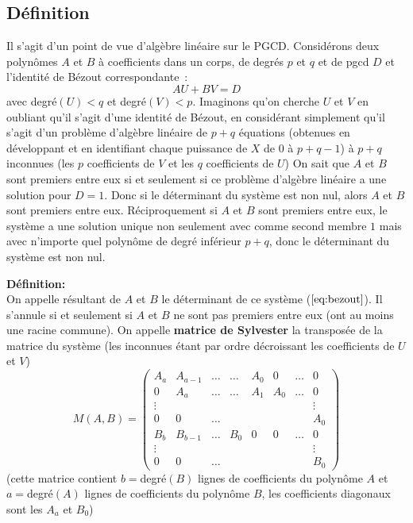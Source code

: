 \documentclass[a4paper,11pt]{article}
\begin{document}
\begin{giacjshere}
\subsection{D\'efinition}
Il s'agit d'un point de vue d'algèbre linéaire sur le PGCD. Considérons
deux polynômes $A$ et $B$ \`a coefficients dans un corps,
de degrés $p$ et $q$ et de pgcd $D$ et 
l'identité de Bézout correspondante~:
\begin{equation} \label{eq:bezout}
 A U + B V =D
\end{equation}
avec degré$(U)<q$ et degré$(V)<p$.
Imaginons qu'on cherche $U$ et $V$ en oubliant qu'il s'agit d'une
identité de Bézout, en considérant simplement qu'il s'agit d'un
problème d'algèbre linéaire de $p+q$ équations (obtenues en développant
et en identifiant chaque puissance de $X$ de 0 à $p+q-1$) 
à $p+q$ inconnues (les $p$ coefficients de $V$ et les $q$ coefficients de $U$)
On sait que $A$ et $B$ sont premiers entre eux si et seulement si ce problème
d'algèbre linéaire a une solution pour $D=1$. Donc si le déterminant
du système est non nul, alors $A$ et $B$ sont premiers entre eux.
Réciproquement si $A$ et $B$ sont premiers entre eux, le système a
une solution unique non seulement avec comme second membre $1$ mais avec
n'importe quel polynôme de degré inférieur $p+q$, donc le
déterminant du système est non nul.

{\bf Définition:} \\
On appelle résultant de $A$ et $B$ le déterminant de ce système 
(\(\ref{eq:bezout}\)). Il s'annule si et seulement si $A$ et $B$
ne sont pas premiers entre eux (ont au moins une racine commune).
On appelle {\bf matrice de Sylvester} la transposée de la matrice du système
(les inconnues étant par ordre décroissant les coefficients de $U$
et $V$)
\[ M(A,B)=\left( \begin{array}{cccccccc}
A_a   & A_{a-1} & \ldots & \ldots & A_0 & 0   & \ldots & 0 \\
0     & A_a     & \ldots & \ldots & A_1 & A_0 & \ldots & 0 \\
\vdots &        &        &      &     &  &      & \vdots \\
0     & 0       & \ldots &     &     &    &    & A_0 \\
B_b   & B_{b-1} & \ldots & B_0  & 0 &  0 & \ldots & 0 \\
\vdots &        &        &      &     &    &    & \vdots \\
0     &   0     & \ldots &    &      &     &   & B_0 
\end{array}
\right) \]
(cette matrice contient $b=$degré$(B)$ lignes de coefficients
du polynôme $A$ et $a=$degré$(A)$ lignes de coefficients du
polynôme $B$, les coefficients diagonaux sont les $A_a$ et $B_0$)


\end{giacjshere}
\end{document}
